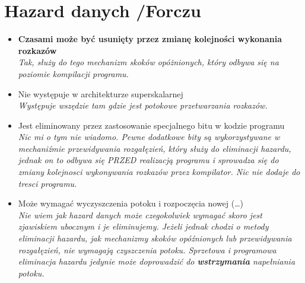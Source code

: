 \documentclass[a4paper,twoside]{article}
\begin{document}
\section{Hazard danych {\small /Forczu}}
	\begin{itemize}
    \item \textbf{Czasami może być usunięty przez zmianę kolejności wykonania rozkazów}\\
    {\small \emph{Tak, służy do tego mechanizm skoków opóżnionych, który odbywa się na poziomie kompilacji programu.}}
    \item Nie występuje w architekturze superskalarnej\\
    {\small \emph{Występuje wszędzie tam gdzie jest potokowe przetwarzania rozkazów.}}
    \item Jest eliminowany przez zastosowanie specjalnego bitu w kodzie programu\\
    {\small \emph{Nic mi o tym nie wiadomo. Pewne dodatkowe bity są wykorzystywane w mechaniźmie przewidywania rozgałęzień, który służy do eliminacji hazardu, jednak on to odbywa się PRZED realizacją programu i sprowadza się do zmiany kolejnosci wykonywania rozkazów przez kompilator. Nic nie dodaje do tresci programu.}}
    \item Może wymagać wyczyszczenia potoku i rozpoczęcia nowej (…)\\
    {\small \emph{Nie wiem jak hazard danych może czegokolwiek wymagać skoro jest zjawiskiem ubocznym i je eliminujemy. Jeżeli jednak chodzi o metody eliminacji hazardu, jak mechanizmy skoków opóźnionych lub przewidywania rozgałęzień, nie wymagają czyszczenia potoku. Sprzetowa i programowa eliminacja hazardu jedynie może doprowadzić do \textbf{wstrzymania} napełniania potoku.}}
    \end{itemize}
\end{document}
